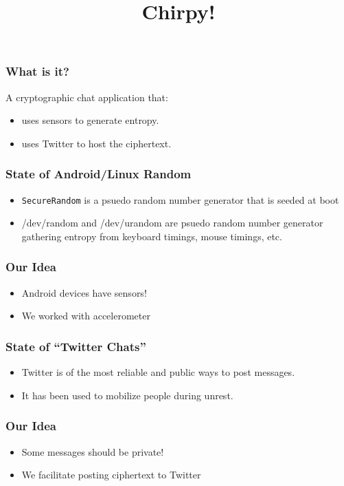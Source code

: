 \documentclass{beamer}
\title{Chirpy!}
\begin{document}
\begin{frame}
    \maketitle
\end{frame}

\begin{frame}
    \frametitle{What is it?}
    A cryptographic chat application that:
    \begin{itemize}
        \item 
            uses sensors to generate entropy.
        \item
            uses Twitter to host the ciphertext.
    \end{itemize}
\end{frame}

\begin{frame}
    \frametitle{State of Android/Linux Random}
    \begin{itemize}
        \item 
            \texttt{SecureRandom} is a psuedo random number generator that is seeded
            at boot
        \item
            /dev/random and /dev/urandom are psuedo random number generator
            gathering entropy from keyboard timings, mouse timings, etc.
    \end{itemize}
\end{frame}

\begin{frame}
    \frametitle{Our Idea}
    \begin{itemize}
        \item
            Android devices have sensors!
        \item
            We worked with accelerometer
    \end{itemize}
\end{frame} 

\begin{frame}
    \frametitle{State of ``Twitter Chats''}
    \begin{itemize}
        \item
            Twitter is of the most reliable and public ways to post messages.
        \item
            It has been used to mobilize people during unrest.
    \end{itemize}
\end{frame}

\begin{frame}
    \frametitle{Our Idea}
    \begin{itemize}
        \item 
            Some messages should be private!
        \item
            We facilitate posting ciphertext to Twitter
    \end{itemize}
\end{frame}
\end{document}
